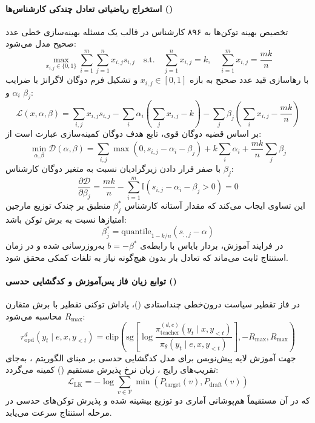 \paragraph*{استخراج ریاضیاتی تعادل چندکی کارشناس‌ها ()}
تخصیص بهینه توکن‌ها به ۸۹۶ کارشناس در قالب یک مسئله بهینه‌سازی خطی عدد صحیح مدل می‌شود:
\begin{equation}
    \max_{x_{i,j} \in \{0, 1\}} \sum_{i=1}^m \sum_{j=1}^n x_{i,j} s_{i,j} \quad \text{s.t.} \quad \sum_{j=1}^n x_{i,j} = k, \quad \sum_{i=1}^m x_{i,j} = \frac{mk}{n}
\end{equation}
با رهاسازی قید عدد صحیح به بازه $x_{i,j} \in [0, 1]$ و تشکیل فرم دوگان لاگرانژ با ضرایب $\alpha_i$ و $\beta_j$:
\begin{equation}
    \mathcal{L}(x, \alpha, \beta) = \sum_{i,j} x_{i,j} s_{i,j} - \sum_i \alpha_i \left(\sum_j x_{i,j} - k\right) - \sum_j \beta_j \left(\sum_i x_{i,j} - \frac{mk}{n}\right)
\end{equation}
بر اساس قضیه دوگان قوی، تابع هدف دوگان کمینه‌سازی عبارت است از:
\begin{equation}
    \min_{\alpha, \beta} \mathcal{D}(\alpha, \beta) = \sum_{i,j} \max(0, s_{i,j} - \alpha_i - \beta_j) + k \sum_i \alpha_i + \frac{mk}{n} \sum_j \beta_j
\end{equation}
با صفر قرار دادن زیرگرادیان نسبت به متغیر دوگان کارشناس $\beta_j$:
\begin{equation}
    \frac{\partial \mathcal{D}}{\partial \beta_j} = \frac{mk}{n} - \sum_{i=1}^m \mathbb{I}(s_{i,j} - \alpha_i - \beta_j > 0) = 0
\end{equation}
این تساوی ایجاب می‌کند که مقدار آستانه کارشناس $\beta_j^*$ منطبق بر چندک توزیع مارجین امتیازها نسبت به برش توکن باشد:
\begin{equation}
    \beta_j^* = \text{quantile}_{1 - k/n}\left( s_{:,j} - \alpha \right)
\end{equation}
در فرایند آموزش، بردار بایاس با رابطه‌ی $b = -\beta^*$ به‌روزرسانی شده و در زمان استنتاج ثابت می‌ماند که تعادل بار بدون هیچ‌گونه نیاز به تلفات کمکی محقق شود.

\paragraph*{توابع زیان فاز پس‌آموزش و کدگشایی حدسی ()}
در فاز تقطیر سیاست درون‌خطی چنداستادی ()، پاداش توکنی تقطیر با برش متقارن $R_{\max}$ محاسبه می‌شود:
\begin{equation}
    r_{\text{opd}}^d(y_t \mid e, x, y_{<t}) = \text{clip}\left( \text{sg}\left[ \log \frac{\pi_{\text{teacher}}^{(d,e)}(y_t \mid x, y_{<t})}{\pi_\theta(y_t \mid e, x, y_{<t})} \right], -R_{\max}, R_{\max} \right)
\end{equation}
جهت آموزش لایه پیش‌نویس  برای مدل کدگشایی حدسی بر مبنای الگوریتم ، به‌جای تقریب‌های رایج ، زیان نرخ پذیرش مستقیم () کمینه می‌گردد:
\begin{equation}
    \mathcal{L}_{\text{LK}} = - \log \sum_{v \in \mathcal{V}} \min\left( P_{\text{target}}(v), P_{\text{draft}}(v) \right)
\end{equation}
که در آن مستقیماً هم‌پوشانی آماری دو توزیع بیشینه شده و پذیرش توکن‌های حدسی در مرحله استنتاج سرعت می‌یابد.

